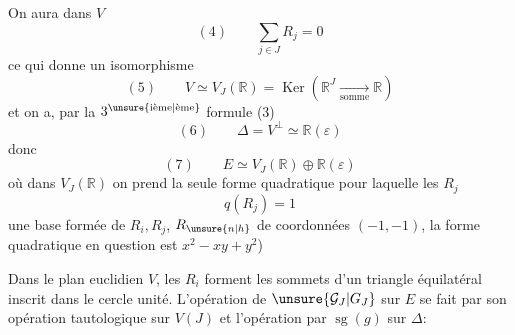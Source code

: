 On aura dans $V$
\[
(4)\qquad\sum_{j\in J}R_j=0
\]
ce qui donne un isomorphisme
\[
(5)\qquad V\simeq V_J(\mathbb R)=\operatorname{Ker}(\mathbb R^J\xrightarrow[\text{somme}]{}\mathbb R)
\]
et on a, par la $3^{\unsure{\text{ième}|\text{ème}}}$ formule (3)
\[
(6)\qquad\Delta=V^\perp\simeq\mathbb R(\varepsilon)
\]
donc
\[
(7)\qquad E\simeq V_J(\mathbb R)\oplus\mathbb R(\varepsilon)
\]
où dans $V_J(\mathbb R)$ on prend la seule forme quadratique  pour laquelle les $R_j$   
\[
q(R_j)=1
\]
 une base formée de $R_i,R_j$, $R_{\unsure{n|h}}$ de coordonnées $(-1,-1)$, la forme quadratique en question est $x^2-xy+y^2$)

Dans le plan euclidien $V$, les $R_i$  forment les sommets d'un triangle équilatéral inscrit dans le cercle unité. L'opération de $\unsure{\mathcal G_J|G_J}$ sur $E$ se fait par son opération  tautologique sur $V(J)$ et l'opération par $\operatorname{sg}(g)$ sur $\Delta$:
